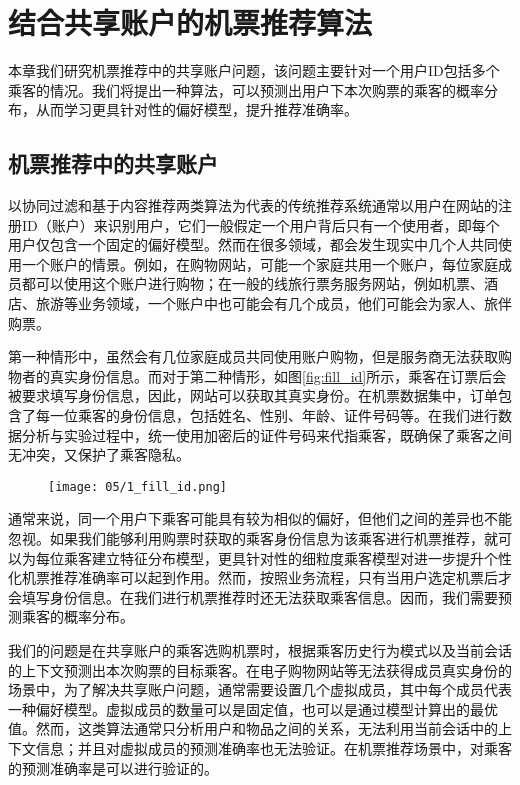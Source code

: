 
\chapter{结合共享账户的机票推荐算法}
\label{chap:share}

本章我们研究机票推荐中的共享账户问题，该问题主要针对一个用户ID包括多个乘客的情况。我们将提出一种算法，可以预测出用户下本次购票的乘客的概率分布，从而学习更具针对性的偏好模型，提升推荐准确率。

\section{机票推荐中的共享账户}

以协同过滤和基于内容推荐两类算法为代表的传统推荐系统通常以用户在网站的注册ID（账户）来识别用户，它们一般假定一个用户背后只有一个使用者，即每个用户仅包含一个固定的偏好模型。然而在很多领域，都会发生现实中几个人共同使用一个账户的情景。例如，在购物网站，可能一个家庭共用一个账户，每位家庭成员都可以使用这个账户进行购物；在一般的线旅行票务服务网站，例如机票、酒店、旅游等业务领域，一个账户中也可能会有几个成员，他们可能会为家人、旅伴购票。


第一种情形中，虽然会有几位家庭成员共同使用账户购物，但是服务商无法获取购物者的真实身份信息。而对于第二种情形，如图\ref{fig:fill_id}所示，乘客在订票后会被要求填写身份信息，因此，网站可以获取其真实身份。在机票数据集中，订单包含了每一位乘客的身份信息，包括姓名、性别、年龄、证件号码等。在我们进行数据分析与实验过程中，统一使用加密后的证件号码来代指乘客，既确保了乘客之间无冲突，又保护了乘客隐私。

\begin{figure}
 \centering
 \texttt{[image: 05/1\_fill\_id.png]}
\end{figure}

通常来说，同一个用户下乘客可能具有较为相似的偏好，但他们之间的差异也不能忽视。如果我们能够利用购票时获取的乘客身份信息为该乘客进行机票推荐，就可以为每位乘客建立特征分布模型，更具针对性的细粒度乘客模型对进一步提升个性化机票推荐准确率可以起到作用。然而，按照业务流程，只有当用户选定机票后才会填写身份信息。在我们进行机票推荐时还无法获取乘客信息。因而，我们需要预测乘客的概率分布。

我们的问题是在共享账户的乘客选购机票时，根据乘客历史行为模式以及当前会话的上下文预测出本次购票的目标乘客。在电子购物网站等无法获得成员真实身份的场景中，为了解决共享账户问题，通常需要设置几个虚拟成员，其中每个成员代表一种偏好模型。虚拟成员的数量可以是固定值，也可以是通过模型计算出的最优值。然而，这类算法通常只分析用户和物品之间的关系，无法利用当前会话中的上下文信息；并且对虚拟成员的预测准确率也无法验证。在机票推荐场景中，对乘客的预测准确率是可以进行验证的。

